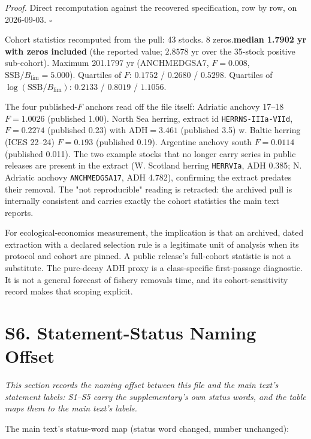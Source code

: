 \documentclass[11pt]{article}
\begin{document}
\emph{Proof.} Direct recomputation against the recovered specification, row by row, on 2026-09-03. \(\square\)

Cohort statistics recomputed from the pull: 43 stocks. 8 zeros.\textbf{median 1.7902 yr with zeros included} (the reported value; \(2.8578\) yr over the 35-stock positive sub-cohort). Maximum 201.1797 yr (ANCHMEDGSA7, \(F=0.008\), \(\mathrm{SSB}/B_{\lim}=5.000\)). Quartiles of \(F\): \(0.1752\) / \(0.2680\) / \(0.5298\). Quartiles of \(\log(\mathrm{SSB}/B_{\lim})\): \(0.2133\) / \(0.8019\) / \(1.1056\).

The four published-\(F\) anchors read off the file itself: Adriatic anchovy 17--18 \(F=1.0026\) (published 1.00). North Sea herring, extract id \texttt{HERRNS-\allowbreak{}IIIa-\allowbreak{}VIId}, \(F=0.2274\) (published 0.23) with \(\mathrm{ADH}=3.461\) (published 3.5) w. Baltic herring (ICES 22--24) \(F=0.193\) (published 0.19). Argentine anchovy south \(F=0.0114\) (published 0.011). The two example stocks that no longer carry series in public releases are present in the extract (W. Scotland herring \texttt{HERRVIa}, ADH 0.385; N. Adriatic anchovy \texttt{ANCHMEDGSA17}, ADH 4.782), confirming the extract predates their removal. The "not reproducible" reading is retracted: the archived pull is internally consistent and carries exactly the cohort statistics the main text reports.

For ecological-economics measurement, the implication is that an archived, dated extraction with a declared selection rule is a legitimate unit of analysis when its protocol and cohort are pinned. A public release's full-cohort statistic is not a substitute. The pure-decay ADH proxy is a class-specific first-passage diagnostic. It is not a general forecast of fishery removals time, and its cohort-sensitivity record makes that scoping explicit.

\section*{S6. Statement-Status Naming Offset}\label{s6-statement-status-naming-offset}

\emph{This section records the naming offset between this file and the main text's statement labels: S1--S5 carry the supplementary's own status words, and the table maps them to the main text's labels.}

The main text's status-word map (status word changed, number unchanged):
\end{document}
